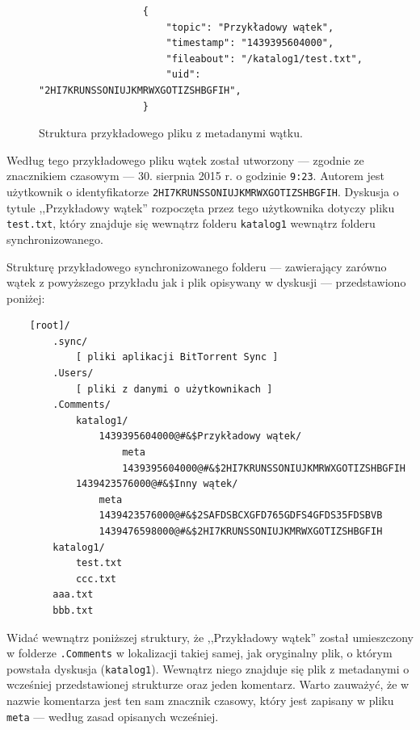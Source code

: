 \documentclass[polish,a4paper,twoside]{ppfcmthesis}
\begin{document}
\begin{figure}[htb]
  \label{thread}
  \begin{verbatim}
                  {
                      "topic": "Przykładowy wątek", 
                      "timestamp": "1439395604000", 
                      "fileabout": "/katalog1/test.txt",
                      "uid": "2HI7KRUNSSONIUJKMRWXGOTIZSHBGFIH", 
                  }
  \end{verbatim}
  \caption{Struktura przykładowego pliku z metadanymi wątku.}
\end{figure}

Według tego przykładowego pliku wątek został utworzony --- zgodnie ze znacznikiem czasowym --- 30. sierpnia 2015 r. o godzinie \texttt{9:23}. Autorem jest użytkownik o identyfikatorze \texttt{2HI7KRU\-NSSONIUJ\-KMRWXGOTI\-ZSHBGFIH}. Dyskusja o tytule ,,Przykładowy wątek'' rozpoczęta przez tego użytkownika dotyczy pliku \texttt{test.txt}, który znajduje się wewnątrz folderu \texttt{katalog1} wewnątrz folderu synchronizowanego.

Strukturę przykładowego synchronizowanego folderu --- zawierający zarówno wątek z powyższego przykładu jak i plik opisywany w dyskusji --- przedstawiono poniżej:

\begin{minipage}{\linewidth}
\vspace{1em}
\begin{verbatim}
    [root]/
        .sync/
            [ pliki aplikacji BitTorrent Sync ]
        .Users/
            [ pliki z danymi o użytkownikach ]
        .Comments/
            katalog1/
                1439395604000@#&$Przykładowy wątek/
                    meta
                    1439395604000@#&$2HI7KRUNSSONIUJKMRWXGOTIZSHBGFIH
            1439423576000@#&$Inny wątek/
                meta
                1439423576000@#&$2SAFDSBCXGFD765GDFS4GFDS35FDSBVB
                1439476598000@#&$2HI7KRUNSSONIUJKMRWXGOTIZSHBGFIH
        katalog1/
            test.txt
            ccc.txt
        aaa.txt
        bbb.txt
\end{verbatim}
\vspace{1em}
\end{minipage}

Widać wewnątrz poniższej struktury, że ,,Przykładowy wątek'' został umieszczony w folderze \texttt{.Comments} w lokalizacji takiej samej, jak oryginalny plik, o którym powstała dyskusja (\texttt{katalog1}). Wewnątrz niego znajduje się plik z metadanymi o wcześniej przedstawionej strukturze oraz jeden komentarz. Warto zauważyć, że w nazwie komentarza jest ten sam znacznik czasowy, który jest zapisany w pliku \texttt{meta} --- według zasad opisanych wcześniej.
\end{document}

